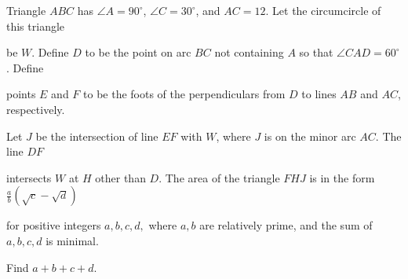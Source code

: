 Triangle $ABC$ has $\angle{A}=90^\circ$,  $\angle{C}=30^\circ$,  and $AC=12$. Let the circumcircle of this triangle

be $W$. Define $D$ to be the point on arc $BC$ not containing $A$ so that $\angle{CAD}=60^\circ$. Define

points $E$ and $F$ to be the foots of the perpendiculars from $D$ to lines $AB$ and $AC$,  respectively.

Let $J$ be the intersection of line $EF$ with $W$,  where $J$ is on the minor arc $AC$. The line $DF$

intersects $W$ at $H$ other than $D$. The area of the triangle $FHJ$ is in the form $\frac{a}{b}(\sqrt{c}-\sqrt{d})$

for positive integers $a,b,c,d,$ where $a,b$ are relatively prime, and the sum of $a,b,c,d$ is minimal.

Find $a+b+c+d$.